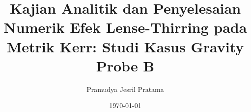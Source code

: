 


\title{\textbf{Kajian Analitik dan Penyelesaian Numerik Efek Lense-Thirring pada Metrik Kerr: Studi Kasus Gravity Probe B}}
\author{Pramudya Jesril Pratama}
\date{\today}



\maketitle




\tableofcontents
\listoffigures
\listoftables

\cleardoublepage
{}
\setcounter{page}{1}







\printbibliography



